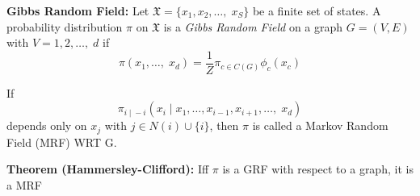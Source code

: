 \documentclass[12pt]{article}
\newcommand{\mfX}{\mathfrak{X}}
\begin{document}
        \textbf{Gibbs Random Field:} Let $\mfX = \{x_1, x_2, \dots,\; x_S\}$ be a finite set of states. A probability distribution $\pi$ on $\mfX$ is a \emph{Gibbs Random Field} on a graph $G = (V, E)$ with $V ={1, 2, \dots, \; d}$ if 
        \[\pi(x_1, \dots,\; x_d) = \frac{1}{Z} \pi_{c \in C(G)} \phi_c(x_c)\]

        If 
        \[\pi_{i \; | \; -i}(x_i \; | \; x_1, \dots, x_{i-1}, x_{i+1}, \dots,\; x_d)\] 
        depends only on $x_j$ with $j \in N(i) \cup \{i\}$, then $\pi$ is called a Markov Random Field (MRF) WRT G. 

        \textbf{Theorem (Hammersley-Clifford):} Iff $\pi$ is a GRF with respect to a graph, it is a MRF
\end{document}
